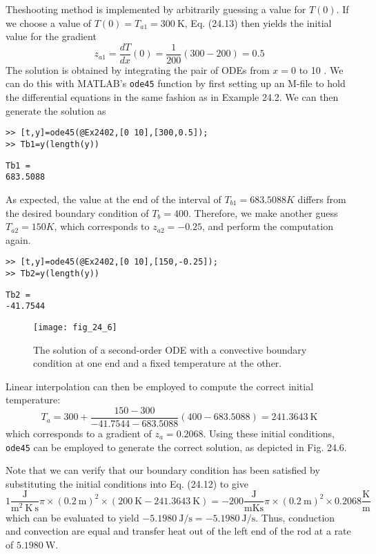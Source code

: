 \documentclass[../main.tex]{subfiles}
\begin{document}
\begin{exmp}
    Theshooting method is implemented by arbitrarily guessing a value for $T(0)$. If we choose a value of $T(0)=T_{a 1}=300 \mathrm{~K}$, Eq. (24.13) then yields the initial value for the gradient
    $$
    z_{a 1}=\frac{d T}{d x}(0)=\frac{1}{200}(300-200)=0.5
    $$
    The solution is obtained by integrating the pair of ODEs from $x=0$ to 10 . We can do this with MATLAB's \texttt{ode45} function by first setting up an M-file to hold the differential equations in the same fashion as in Example 24.2. We can then generate the solution as

    \noindent\texttt{>> [t,y]=ode45(@Ex2402,[0 10],[300,0.5]);\\
    >> Tb1=y(length(y))}

    \noindent\texttt{Tb1 =\\
    \vspace{\smallskipamount} 683.5088}

    As expected, the value at the end of the interval of $T_{b1} = 683.5088 K$ differs from the
    desired boundary condition of $T_b = 400$. Therefore, we make another guess $T_{a2} = 150 K$,
    which corresponds to $z_{a2} = -0.25$, and perform the computation again.

    \noindent\texttt{>> [t,y]=ode45(@Ex2402,[0 10],[150,-0.25]);\\
    >> Tb2=y(length(y))}

    \noindent\texttt{Tb2 =\\
    \vspace{\smallskipamount} -41.7544}

    \begin{figure}[H]
        \centering
        \texttt{[image: fig\_24\_6]}
       \caption{\textsf{The solution of a second-order ODE with a convective boundary condition at one end and a
       fixed temperature at the other.}}\label{fig:fig_24_6}
    \end{figure}

    \noindent Linear interpolation can then be employed to compute the correct initial temperature:
    $$
    T_{a}=300+\frac{150-300}{-41.7544-683.5088}(400-683.5088)=241.3643 \mathrm{~K}
    $$
    which corresponds to a gradient of $z_{a}=0.2068$. Using these initial conditions, \texttt{ode45} can be employed to generate the correct solution, as depicted in Fig. 24.6.

    Note that we can verify that our boundary condition has been satisfied by substituting the initial conditions into Eq. (24.12) to give
    $$
    1 \frac{\mathrm{J}}{\mathrm{m}^{2} \mathrm{~K} \mathrm{~s}} \pi \times(0.2 \mathrm{~m})^{2} \times(200 \mathrm{~K}-241.3643 \mathrm{~K})=-200 \frac{\mathrm{J}}{\mathrm{m} \mathrm{K} \mathrm{s}} \pi \times(0.2 \mathrm{~m})^{2} \times 0.2068 \frac{\mathrm{K}}{\mathrm{m}}
    $$
    which can be evaluated to yield $-5.1980 \mathrm{~J} / \mathrm{s}=-5.1980 \mathrm{~J} / \mathrm{s}$. Thus, conduction and convection are equal and transfer heat out of the left end of the rod at a rate of $5.1980 \mathrm{~W}$.
\end{exmp}
\end{document}
